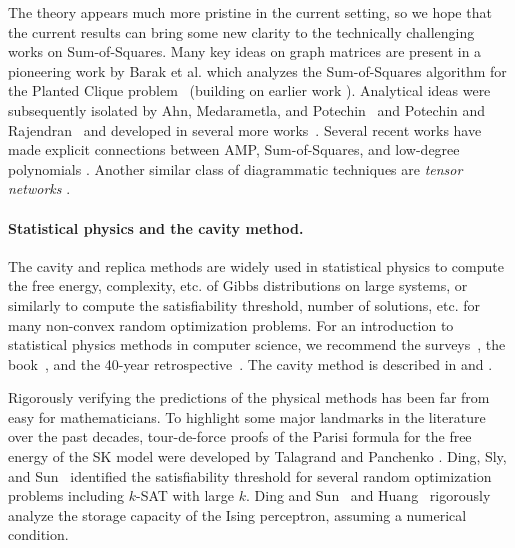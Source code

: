 \documentclass[12pt]{article}
\begin{document}
The theory appears much more pristine in the current setting, so we
hope that the current results can bring some new clarity to the technically challenging works on Sum-of-Squares.
Many key ideas on graph matrices are present in a pioneering work
by Barak et al. which analyzes the Sum-of-Squares algorithm
for the Planted Clique problem~\cite{BHKKMP16:PlantedClique} (building on earlier work \cite{deshpande2015improved, meka2015sum, hopkins2018integrality}).
Analytical ideas were subsequently isolated by Ahn, Medarametla, and Potechin~\cite{AMP20} and Potechin and Rajendran~\cite{PR20:Machinery, potechin2022sub} and developed in several
more works~\cite{GJJPR20:SherringtonKirkpatrickPlantedAffinePlanes, RajendranTulsiani20, JPRTX21:SparseIndependentSet,
JP22:InnerProductPolynomials, jones2022symmetrized, jones2023sum, xu2024ultrasparse}.
Several recent works have made explicit connections between AMP, Sum-of-Squares, and low-degree polynomials \cite{montanari2022equivalence, ivkov2023semidefinite, singh2023highentropy, singh2024sum}.
Another similar class of diagrammatic techniques are \emph{tensor networks} \cite{moitra2019spectral, kunisky2024tensor}.


\vspace{-8pt}
\paragraph{Statistical physics and the cavity method.}
The cavity and replica methods are widely used in statistical physics to compute the free energy, complexity, etc. of Gibbs distributions on large systems,
or similarly to compute the satisfiability threshold, number of solutions, etc. for many non-convex random optimization problems.
For an introduction to statistical physics methods in computer science, we recommend the surveys~\cite{martin2001statistical, zdeborova2016statistical, gabrie2020mean}, the book~\cite{MezardMontanari}, and the 40-year retrospective~\cite{charbonneau2023spin}.
The cavity method is described in \cite{mezard2003cavity} and \cite[Part V]{MezardMontanari}.

Rigorously verifying the predictions of the physical methods has
been far from easy for mathematicians.
To highlight some major landmarks in the literature over the past decades, tour-de-force proofs
of the Parisi formula for the free energy of the
SK model were developed by
Talagrand \cite{Talagrand06, talagrandBook} and Panchenko \cite{panchenko2013sherrington}.
Ding, Sly, and Sun~\cite{DSS16:MaxIndependentSets, ding2014satisfiability, ding2015proof} identified
the satisfiability threshold for several random optimization problems including $k$-SAT with large $k$.
Ding and Sun~\cite{ding2019capacity} and Huang~\cite{huang2024capacity}
rigorously analyze the storage capacity of the Ising perceptron, assuming a numerical condition.
\end{document}
